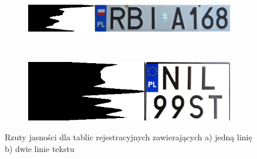 \begin{figure}
  \centering
  \begin{subfigure}[b]{0.45\textwidth}
    \includegraphics[width=\textwidth]{img/rzut-liczba-linii-jeden}
    \label{fig:rzut_liczba_linii_jeden}
    \caption{}
  \end{subfigure}
  ~
  \begin{subfigure}[b]{0.45\textwidth}
    \includegraphics[width=\textwidth]{img/rzut-liczba-linii-dwa}
    \label{fig:rzut_liczba_linii_dwa}
    \caption{}
  \end{subfigure}
  \caption{Rzuty jasności dla tablic rejestracyjnych zawierających a) jedną linię b) dwie linie tekstu}
  \label{fig:rzut_liczba_linii}
\end{figure}


